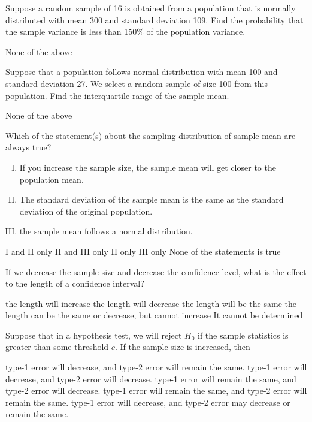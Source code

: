 \documentclass[letterpaper,10pt,addpoints]{exam}
\begin{document}
\begin{questions}
\question Suppose a random sample of 16 is obtained from a population that is normally distributed with mean 300 and standard deviation 109. Find the probability that the sample variance is less than 150\% of the population variance. 
\begin{choices}
  \choice None of the above
\end{choices}

\question Suppose that a population follows normal distribution with mean 100 and standard deviation 27. We select a random sample of size 100 from this population. Find the interquartile range of the sample mean. 
\begin{choices}
  \choice None of the above
\end{choices}


\question Which of the statement(s) about the sampling distribution of sample mean are always true?
\begin{enumerate}[I.]
  \item If you increase the sample size, the sample mean will get closer to the population mean.
  \item The standard deviation of the sample mean is the same as the standard deviation of the original population.
  \item the sample mean follows a normal distribution.
\end{enumerate}
\begin{choices}
  \choice I and II only
  \choice II and III only
  \choice II only
  \choice III only
  \correctchoice None of the statements is true
\end{choices}


\question If we decrease the sample size and decrease the confidence level, what is the effect to the length of a confidence interval?
\begin{choices}
  \choice the length will increase
  \choice the length will decrease
  \choice the length will be the same
  \choice the length can be the same or decrease, but cannot increase
  \correctchoice It cannot be determined
\end{choices}

\question Suppose that in a hypothesis test, we will reject $H_0$ if the sample statistics is greater than some threshold $c$. If the sample size is increased, then 
\begin{choices}
  \choice type-1 error will decrease, and type-2 error will remain the same.
  \correctchoice type-1 error will decrease, and type-2 error will decrease.
  \choice type-1 error will remain the same, and type-2 error will decrease.
  \choice type-1 error will remain the same, and type-2 error will remain the same.
  \choice type-1 error will decrease, and type-2 error may decrease or remain the same.
\end{choices}


\end{questions}
\end{document}

